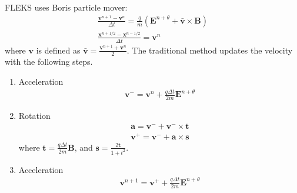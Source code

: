 \documentclass[a4paper, 11pt]{article}
\begin{document}
FLEKS uses Boris particle mover: 
\begin{eqnarray}
\frac{\mathbf{v}^{n+1} - \mathbf{v}^{n}}{\Delta t} = \frac{q}{m}(\mathbf{E}^{n+\theta} + \bar{\mathbf{v}}\times\mathbf{B}) \\
\frac{\mathbf{x}^{n+1/2} - \mathbf{x}^{n-1/2}}{\Delta t} = \mathbf{v}^n
\end{eqnarray}
where $\mathbf{v}$ is defined as $\bar{\mathbf{v}} = \frac{\mathbf{v}^{n+1} + \mathbf{v}^{n}}{2}$. The traditional method updates the velocity with the following steps.

\begin{enumerate}
    \item Acceleration 
\begin{eqnarray}
    \mathbf{v}^- = \mathbf{v}^{n} + \frac{q\Delta t}{2m}\mathbf{E}^{n+\theta}
\end{eqnarray}

    \item Rotation
\begin{eqnarray} 
    \mathbf{a} = \mathbf{v}^- + \mathbf{v}^- \times \mathbf{t} \\
    \mathbf{v}^+ = \mathbf{v}^- + \mathbf{a} \times \mathbf{s}
\end{eqnarray}
    where $\mathbf{t} = \frac{q\Delta t}{2m} \mathbf{B}$, and $\mathbf{s} = \frac{2\mathbf{t}}{1+t^2}$.

    \item  Acceleration
\begin{eqnarray}    
    \mathbf{v}^{n+1} = \mathbf{v}^+ + \frac{q\Delta t}{2m}\mathbf{E}^{n+\theta}
\end{eqnarray}
\end{enumerate}
\end{document}
